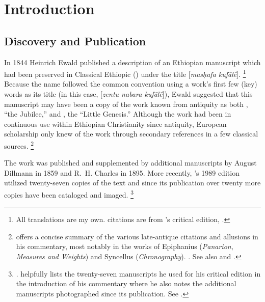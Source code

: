 
\nocite{dillamnn_jbw_kleine}
\nocite{ewald_zkm1844}


\section{Introduction}

\subsection{Discovery and Publication}
In 1844 Heinrich Ewald published a description of an Ethiopian manuscript which had been preserved in Classical Ethiopic (\geez) under the title [\emph{masḥafa kufālē}].%
\footnote{All translations are my own. \geez citations are from \vanderkam's critical edition, \cite*{vanderkam1989}.}
Because the name followed the common convention using a work's first few (key) words as its title (in this case,  [\emph{zentu nabara kufālē}]), Ewald suggested that this manuscript may have been a copy of the work known from antiquity as both , ``the Jubilee,'' and , the ``Little Genesis.''\autocite[176--179]{ewald_zkm1844} Although the work had been in continuous use within Ethiopian Christianity since antiquity, European scholarship only knew of the work through secondary references in a few classical sources.%
\footnote{\vanderkam offers a concise summary of the various late-antique citations and allusions in his commentary, most notably in the works of Epiphanius (\emph{Panarion}, \emph{Measures and Weights}) and Syncellus (\emph{Chronography}). \cite[1:10--14]{vanderkam2018}. See also \cite{reed_kister-etal2015} and \cite{kreps_ch2018}.%
}%

The work was published and supplemented by additional manuscripts by August Dillmann in 1859\autocite{dillmann1859} and R.~H. Charles in 1895.\autocite{charles1895} More recently, \vanderkam's 1989 edition utilized twenty-seven copies of the text\autocite[1:xiv--xvi]{vanderkam1989} and since its publication over twenty more copies have been cataloged and imaged.%
%
\footnote{%
\cite{erho_bsoas2013}.
\vanderkam helpfully lists the twenty-seven manuscripts he used for his critical edition in the introduction of his commentary where he also notes the additional manuscripts photographed since its publication. See \cite[1:14--16]{vanderkam2018}.
}

